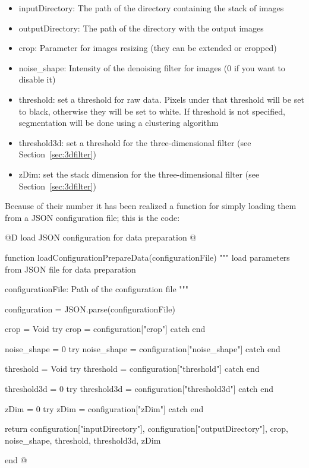 \documentclass[11pt,oneside]{article}	%
\begin{document}
\begin{itemize}
 \item inputDirectory: The path of the directory containing the stack of images
 \item outputDirectory: The path of the directory with the output images
 \item crop: Parameter for images resizing (they can be extended or cropped)
 \item noise\_shape: Intensity of the denoising filter for images (0 if you want to disable it)
 \item threshold: set a threshold for raw data. Pixels under that threshold will be set to black, otherwise they will be set to white. If threshold is not specified, segmentation will be done using a clustering algorithm
 \item threshold3d: set a threshold for the three-dimensional filter (see Section~\ref{sec:3dfilter})
 \item zDim: set the stack dimension for the three-dimensional filter (see Section~\ref{sec:3dfilter})
\end{itemize}

Because of their number it has been realized a function for simply loading them from a JSON configuration file; this is the code:

@D load JSON configuration for data preparation
@{function loadConfigurationPrepareData(configurationFile)
  """
  load parameters from JSON file for data preparation

  configurationFile: Path of the configuration file
  """

  configuration = JSON.parse(configurationFile)


  crop = Void
  try
    crop = configuration["crop"]
  catch
  end
  
  noise_shape = 0
  try
    noise_shape = configuration["noise_shape"]
  catch
  end
  
  threshold = Void
  try
    threshold = configuration["threshold"]
  catch
  end
  
  threshold3d = 0
  try
    threshold3d = configuration["threshold3d"]
  catch
  end
  
  zDim = 0
  try
    zDim = configuration["zDim"]
  catch
  end

  
  return configuration["inputDirectory"], configuration["outputDirectory"],
        crop, noise_shape, threshold, threshold3d, zDim

end
@}
\end{document}
